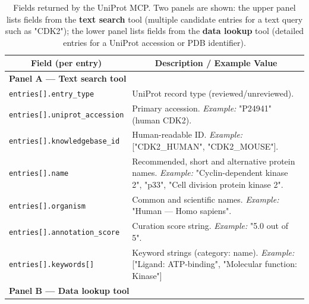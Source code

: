 \documentclass{article}
\begin{document}
\begin{table}[!htbp]
\caption{Fields returned by the UniProt MCP. Two panels are shown: the upper panel lists fields from the \textbf{text search} tool (multiple candidate entries for a text query such as "CDK2"); the lower panel lists fields from the \textbf{data lookup} tool (detailed entries for a UniProt accession or PDB identifier).}
\label{tab:uniprot-mcp-cdk2}
\begin{center}
\begin{tabularx}{\textwidth}{p{5.5cm}X}
\toprule
\multicolumn{1}{c}{\bf Field (per entry)} & \multicolumn{1}{c}{\bf Description / Example Value} \\
\midrule
\multicolumn{2}{l}{\bf Panel A — Text search tool} \\
\midrule
\texttt{entries[].entry\_type} & UniProt record type (reviewed/unreviewed). \\
\addlinespace
\texttt{entries[].uniprot\_accession} & Primary accession. \emph{Example:} "P24941" (human CDK2). \\
\addlinespace
\texttt{entries[].knowledgebase\_id} & Human-readable ID. \emph{Example:} ["CDK2\_HUMAN", "CDK2\_MOUSE"]. \\
\addlinespace
\texttt{entries[].name} & Recommended, short and alternative protein names. \emph{Example:} "Cyclin-dependent kinase 2", "p33", "Cell division protein kinase 2". \\
\addlinespace
\texttt{entries[].organism} & Common and scientific names. \emph{Example:} "Human — Homo sapiens". \\
\addlinespace
\texttt{entries[].annotation\_score} & Curation score string. \emph{Example:} "5.0 out of 5". \\
\addlinespace
\texttt{entries[].keywords[]} & Keyword strings (category: name). \emph{Example:} ["Ligand: ATP-binding", "Molecular function: Kinase"] \\

\midrule
\multicolumn{2}{l}{\bf Panel B — Data lookup tool} \\
\midrule


\end{tabularx}
\end{center}
\end{table}
\end{document}
